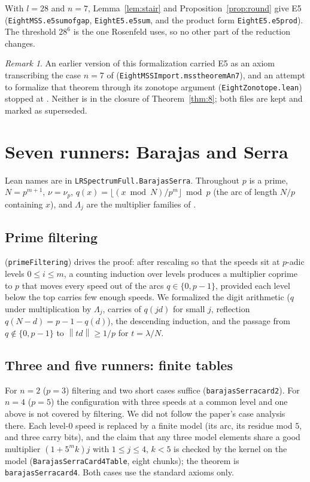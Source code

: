 \documentclass[11pt]{amsart}
\theoremstyle{plain}
\theoremstyle{definition}
\theoremstyle{remark}
\newtheorem{remark}[theorem]{Remark}
\newcommand{\nrm}[1]{\left\lVert #1 \right\rVert}
\newcommand{\lean}[1]{{\def\_{\textunderscore\allowbreak}\def\.{.\allowbreak}\texttt{#1}}}
\begin{document}
With $l=28$ and $n=7$, Lemma~\ref{lem:stair} and Proposition~\ref{prop:round} give E5
(\lean{EightMSS.e5\_sum\_of\_gap}, \lean{EightE5.e5\_sum}, and the product form
\lean{EightE5.e5\_prod}). The threshold $28^6$ is the one Rosenfeld uses, so no other part of the
reduction changes.

\begin{remark}
An earlier version of this formalization carried E5 as an axiom transcribing the case $n=7$ of
\cite[Theorem~A$'$]{mss} (\lean{EightMSSImport.mss\_theorem\_A\_n7}), and an attempt to formalize
that theorem through its zonotope argument (\lean{EightZonotope.lean}) stopped at
\cite[Propositions~3.3, 3.4]{mss}. Neither is in the closure of Theorem~\ref{thm:8}; both files are
kept and marked as superseded.
\end{remark}

\section{Seven runners: Barajas and Serra}\label{sec:bs}

Lean names are in \lean{LRSpectrumFull.BarajasSerra}. Throughout $p$ is a prime, $N=p^{m+1}$,
$\nu=\nu_p$, $q(x)=\lfloor (x\bmod N)/p^m\rfloor \bmod p$ (the arc of length $N/p$ containing
$x$), and $\Lambda_j$ are the multiplier families of \cite[Section~2]{bs}.

\subsection{Prime filtering}
\cite[Lemma~2]{bs} (\lean{primeFiltering}) drives the proof: after rescaling so that the speeds sit
at $p$-adic levels $0\le i\le m$, a counting induction over levels produces a multiplier coprime to
$p$ that moves every speed out of the arcs $q\in\{0,p-1\}$, provided each level below the top
carries few enough speeds. We formalized the digit arithmetic ($q$ under multiplication by
$\Lambda_j$, carries of $q(jd)$ for small $j$, reflection $q(N-d)=p-1-q(d)$), the descending
induction, and the passage from $q\notin\{0,p-1\}$ to $\nrm{td}\ge1/p$ for $t=\lambda/N$.

\subsection{Three and five runners: finite tables}
For $n=2$ ($p=3$) filtering and two short cases suffice (\lean{barajasSerra\_card2}). For $n=4$
($p=5$) the configuration with three speeds at a common level and one above is not covered by
filtering. We did not follow the paper's case analysis there. Each level-$0$ speed is replaced by a
finite model (its arc, its residue mod $5$, and three carry bits), and the claim that any three
model elements share a good multiplier $(1+5^mk)j$ with $1\le j\le4$, $k<5$ is checked by the
kernel on the model (\lean{BarajasSerraCard4Table}, eight chunks); the theorem is
\lean{barajasSerra\_card4}. Both cases use the standard axioms only.
\end{document}
